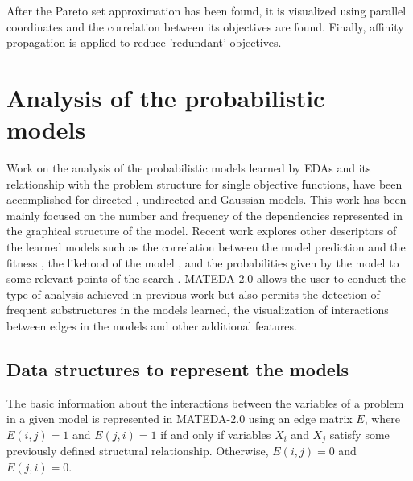 \documentclass[a4paper]{article}
\begin{document}
 After the Pareto set approximation has been found, it is visualized using  parallel coordinates
 and the correlation between its objectives are found. Finally, affinity propagation is applied
 to reduce 'redundant' objectives.


\section{Analysis of the probabilistic models}

Work on the analysis  of the probabilistic models learned by EDAs
and its relationship with the problem structure for single objective
functions, have been accomplished for directed
\cite{Bengoetxea:2003,Echegoyen_et_al:2007,Echegoyen_et_al:2008,Hauschild_and_Pelikan:2008,Hauschild_et_al:2008,Lima_et_al:2007,Muehlenbein_and_Hoens:2005},
undirected
\cite{Santana:2005,Santana_et_al:2007b,Santana_et_al:2008} and
Gaussian \cite{Bengoetxea:2003} models. This work has been mainly
focused on the number and frequency of the dependencies represented
in the graphical structure of the model. Recent work explores other descriptors of the learned
models such as the correlation between the model prediction and the fitness \cite{Brownlee_et_al:2008}, the likehood of the model \cite{Lima_et_al:2008},
and the probabilities given by the model to some relevant points of the search \cite{Echegoyen_et_al:2009}.  MATEDA-2.0 allows the user to conduct the type of
analysis achieved in previous work but also permits the detection of
frequent substructures in the models learned, the visualization of
interactions between edges in the models and other additional
features.


\subsection{Data structures to represent the models}

  The basic  information about the interactions between the variables of a problem in a given model
  is represented in MATEDA-2.0 using an edge matrix $E$, where  $E(i,j)=1$ and $E(j,i)=1$
  if and only if  variables $X_i$ and $X_j$ satisfy some previously defined  structural relationship.
  Otherwise,  $E(i,j)=0$ and $E(j,i)=0$.
\end{document}
